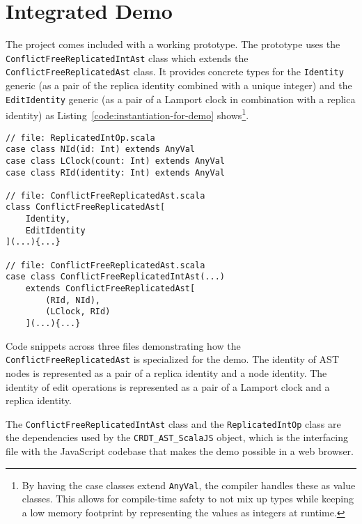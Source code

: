 \section{Integrated Demo}\label{sec:integrated-demo}

The project comes included with a working prototype.
The prototype uses the \texttt{ConflictFreeReplicatedIntAst} class which extends the
\texttt{ConflictFreeReplicatedAst} class.
It provides concrete types for the \texttt{Identity} generic (as a pair of the replica identity combined
with a unique integer) and the \texttt{EditIdentity} generic (as a pair of a Lamport clock in combination
with a replica identity) as Listing~\ref{code:instantiation-for-demo} shows\footnote{
    By having the case classes extend \texttt{AnyVal}, the compiler handles these as value classes.
    This allows for compile-time safety to not mix up types while keeping a low memory footprint by representing the
    values as integers at runtime.
}.

\begin{listing}
    \begin{verbatim}
// file: ReplicatedIntOp.scala
case class NId(id: Int) extends AnyVal
case class LClock(count: Int) extends AnyVal
case class RId(identity: Int) extends AnyVal

// file: ConflictFreeReplicatedAst.scala
class ConflictFreeReplicatedAst[
    Identity,
    EditIdentity
](...){...}

// file: ConflictFreeReplicatedAst.scala
case class ConflictFreeReplicatedIntAst(...)
    extends ConflictFreeReplicatedAst[
        (RId, NId),
        (LClock, RId)
    ](...){...}
    \end{verbatim}
    \caption{
        Code snippets across three files demonstrating how the \texttt{ConflictFreeReplicatedAst} is
        specialized for the demo.
        The identity of AST nodes is represented as a pair of a replica identity and a node identity.
        The identity of edit operations is represented as a pair of a Lamport clock and a replica identity.
    }
    \label{code:instantiation-for-demo}
\end{listing}

\begin{sloppypar}
    The \texttt{ConflictFreeReplicatedIntAst} class and the \texttt{ReplicatedIntOp} class are the
    dependencies used by the \texttt{CRDT_AST_ScalaJS} object, which is the interfacing file with the JavaScript
    codebase that makes the demo possible in a web browser.
\end{sloppypar}

